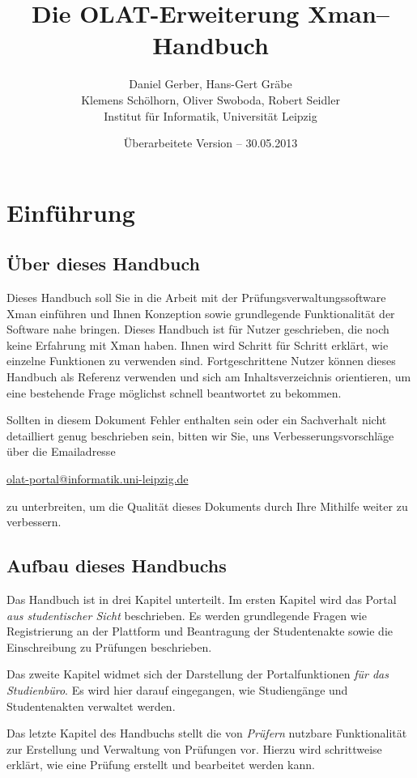 \documentclass[a4paper,11pt]{article}
\author{Daniel Gerber, Hans-Gert Gräbe\\ 
Klemens Schölhorn, Oliver Swoboda, Robert Seidler\\
Institut für Informatik, Universität Leipzig}
\title{Die OLAT-Erweiterung Xman-- Handbuch}
\date{Überarbeitete Version -- 30.05.2013}
\begin{document}
\maketitle

\tableofcontents

\clearpage
\section*{Einführung}

\subsection*{Über dieses Handbuch}

Dieses Handbuch soll Sie in die Arbeit mit der Prüfungsverwaltungssoftware
Xman einführen und Ihnen Konzeption sowie grundlegende Funktionalität der
Software nahe bringen. Dieses Handbuch ist für Nutzer geschrieben, die noch
keine Erfahrung mit Xman haben. Ihnen wird Schritt für Schritt erklärt, wie
einzelne Funktionen zu verwenden sind.  Fortgeschrittene Nutzer können dieses
Handbuch als Referenz verwenden und sich am Inhaltsverzeichnis orientieren, um
eine bestehende Frage möglichst schnell beantwortet zu bekommen.

Sollten in diesem Dokument Fehler enthalten sein oder ein Sachverhalt nicht
detailliert genug beschrieben sein, bitten wir Sie, uns
Verbesserungsvorschläge über die Emailadresse
\begin{center}
  \url{olat-portal@informatik.uni-leipzig.de} 
\end{center}
zu unterbreiten, um die Qualität dieses Dokuments durch Ihre Mithilfe weiter
zu verbessern.

\subsection*{Aufbau dieses Handbuchs}

Das Handbuch ist in drei Kapitel unterteilt. Im ersten Kapitel wird das Portal
{\em aus studentischer Sicht} beschrieben. Es werden
grundlegende Fragen wie Registrierung an der Plattform und Beantragung der
Studentenakte sowie die Einschreibung zu Prüfungen beschrieben.

Das zweite Kapitel widmet sich der Darstellung der Portalfunktionen {\em für
das Studienbüro}. Es wird hier darauf eingegangen,
wie Studiengänge und Studentenakten verwaltet werden.

Das letzte Kapitel des Handbuchs stellt die von {\em Prüfern}
nutzbare Funktionalität zur Erstellung und Verwaltung von Prüfungen vor.
Hierzu wird schrittweise erklärt, wie eine Prüfung erstellt und bearbeitet
werden kann.
\end{document}
